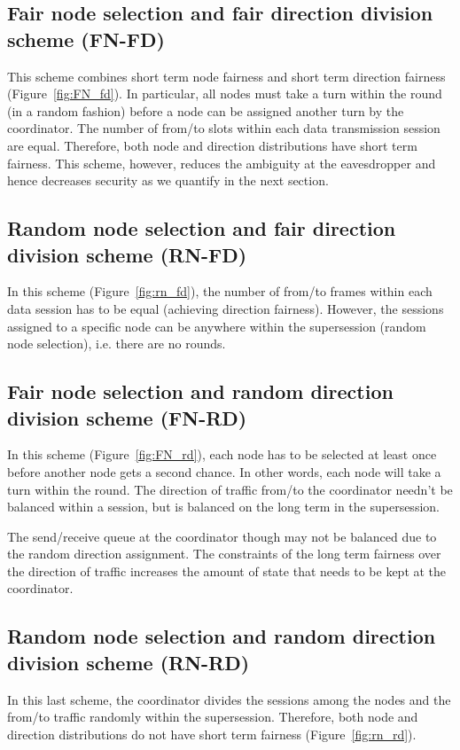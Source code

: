 \documentclass[10pt,letterpaper,conference]{IEEEtran}
\begin{document}
\subsection{Fair node selection and fair direction division scheme (FN-FD)}
This scheme combines short term node fairness and short term
direction fairness (Figure~\ref{fig:FN_fd}). In particular, all nodes must take a turn within the round (in a random fashion) before a node can be assigned another turn by the coordinator. The number of from/to slots within each data transmission session are equal. Therefore, both node and direction distributions have short
term fairness. This scheme, however, reduces the
ambiguity at the eavesdropper and hence decreases security as we quantify in the next section.

\subsection{Random node selection and fair direction division scheme (RN-FD)}

In this scheme (Figure~\ref{fig:rn_fd}), the number of from/to frames within each data session has to be equal (achieving direction fairness). However, the sessions assigned to a specific node can be anywhere within the supersession (random node selection), i.e. there are no rounds.

\subsection{Fair node selection and random direction division scheme (FN-RD)}

In this scheme (Figure~\ref{fig:FN_rd}), each node has to be selected at least once before another node
gets a second chance. In other words, each node will take a turn within the
round. The direction of traffic from/to the coordinator needn't be balanced
within a session, but is balanced on the long term in the supersession.

The send/receive queue at the coordinator though may not be balanced due to the random
direction assignment. The constraints of the long term fairness over the
direction of traffic increases the amount of state that needs to be kept at the
coordinator.

\subsection{Random node selection and random direction division scheme (RN-RD)}
In this last scheme, the coordinator divides the sessions among the nodes and the from/to traffic randomly
within the supersession. Therefore, both node and direction distributions do
not have short term fairness (Figure~\ref{fig:rn_rd}).
\end{document}
